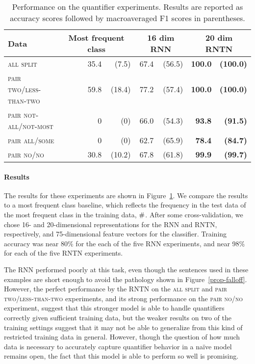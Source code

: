 \begin{table}[tp]
  \centering
  \setlength{\tabcolsep}{10pt}
  \begin{tabular}{ l rr@{ \ }r r@{ \ }r r@{ \ }r }
    \toprule
    Data & \multicolumn{3}{c}{Most frequent class} & \multicolumn{2}{c}{16 dim RNN}  & \multicolumn{2}{c}{20 dim RNTN}\\
    \midrule
    \textsc{all split}	            &~~~~& 35.4 &(7.5) &	67.4&(56.5)& \textbf{100.0} & \textbf{(100.0)}
    \\[1ex]    
    \textsc{pair two/less-than-two} && 59.8 &(18.4) & 77.2 &(57.4) &	\textbf{100.0} &\textbf{(100.0)} \\
    \textsc{pair not-all/not-most}  &&    0 &(0)    & 66.0 &(54.3) &	\textbf{93.8}  &\textbf{(91.5)} \\
    \textsc{pair all/some}	    &&    0& (0)    & 62.7 &(65.9)  &	\textbf{78.4}  &\textbf{(84.7)} \\
    \textsc{pair no/no}	            && 30.8  &(10.2) & 67.8 & (61.8) &	\textbf{99.9}  &\textbf{(99.7)} \\
    \bottomrule
  \end{tabular}
  \caption{Performance on the quantifier experiments. Results are reported as accuracy scores followed by macroaveraged F1 scores in parentheses.}
  \label{resultstable}
\end{table} 


\paragraph{Results} 
The results for these experiments are shown in
Figure~\ref{resultstable}. We compare the results to a most frequent
class baseline, which reflects the frequency in the test data of the
most frequent class in the training data, $\mathbin{\#}$.  After some
cross-validation, we chose 16- and 20-dimensional representations for
the RNN and RNTN, respectively, and 75-dimensional feature vectors for
the classifier. Training
accuracy was near 80\% for the each of the five RNN experiments, and 
near 98\% for each of the five RNTN experiments.


The RNN performed poorly at this task, even though the sentences used
in these examples are short enough to avoid the pathology shown in
Figure~\ref{prop-falloff}.  However, the perfect performance by the
RNTN on the \textsc{all split} and \textsc{pair two/less-than-two}
experiments, and its strong performance on the \textsc{pair no/no}
experiment, suggest that this stronger model is able to handle
quantifiers correctly given sufficient training data, but the weaker
results on two of the training settings suggest that it may not be
able to generalize from this kind of restricted training data in general. However, though the question
of how much data is necessary to accurately capture quantifier
behavior in a na\"ive model remains open, the fact that this model is able to perform so well is promising.
